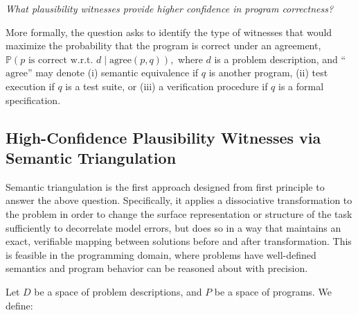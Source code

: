 \documentclass[acmsmall,screen,nonacm]{acmart}
\begin{document}
\begin{center}
\vspace{1mm}
\emph{What plausibility witnesses provide higher confidence in program correctness?}
\vspace{1mm}
\end{center}

\noindent More formally, the question asks to identify the type of witnesses that would maximize the probability that the program is correct under an agreement, $\mathds{P}(p\text{ is correct w.r.t. }d \mid \mathrm{agree}(p, q)),$ where $d$ is a problem description, and ``$\mathrm{agree}$'' may denote (i) semantic equivalence if $q$ is another program, (ii) test execution if $q$ is a test suite, or (iii) a verification procedure if $q$ is a formal specification.

\subsection{High-Confidence Plausibility Witnesses via Semantic Triangulation}

Semantic triangulation is the first approach designed from first principle to answer the above question. Specifically, it applies a dissociative transformation to the problem in order to change the surface representation or structure of the task sufficiently to decorrelate model errors, but does so in a way that maintains an exact, verifiable mapping between solutions before and after transformation. This is feasible in the programming domain, where problems have well-defined semantics and program behavior can be reasoned about with precision.

Let $D$ be a space of problem descriptions, and $P$ be a space of programs. We define:
\end{document}
